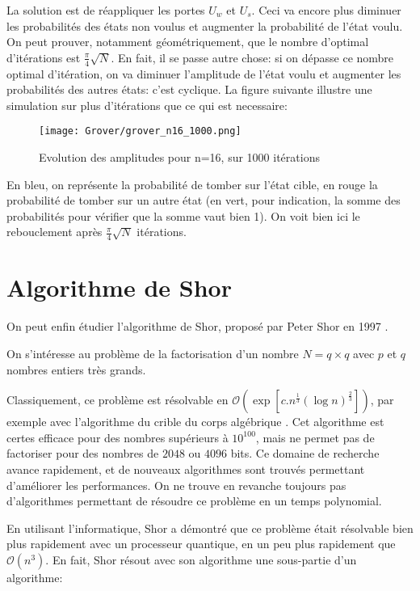 La solution est de réappliquer les portes $U_w$ et $U_s$. Ceci va encore plus diminuer les probabilités des états non voulus et augmenter la probabilité de l'état voulu.
On peut prouver, notamment géométriquement, que le nombre d'optimal d'itérations est $\frac{\pi}{4}\sqrt{N}$. En fait, il se passe autre chose: si on dépasse ce nombre optimal d'itération, on va diminuer l'amplitude de l'état voulu et augmenter les probabilités des autres états: c'est cyclique. La figure suivante illustre une simulation sur plus d'itérations que ce qui est necessaire:

\begin{figure}[htbp]
  \centering
  \texttt{[image: Grover/grover\_n16\_1000.png]}
  \caption{Evolution des amplitudes pour n=16, sur 1000 itérations}
\end{figure}

En bleu, on représente la probabilité de tomber sur l'état cible, en rouge la probabilité de tomber sur un autre état (en vert, pour indication, la somme des probabilités pour vérifier que la somme vaut bien 1). On voit bien ici le rebouclement après $\frac{\pi}{4}\sqrt{N}$ itérations.

\section{Algorithme de Shor}

On peut enfin étudier l'algorithme de Shor, proposé par Peter Shor en 1997 \cite{Shor97}.

\begin{pb}
  On s'intéresse au problème de la factorisation d'un nombre $N=q \times q$ avec $p$ et $q$ nombres entiers très grands.
\end{pb}

Classiquement, ce problème est résolvable en $\mathcal{O}(\exp{[c . n^{\frac{1}{3}} (\log n)^{\frac{2}{3}} ]})$, par exemple avec l'algorithme du crible du corps algébrique \cite{NFS-RSA220}. Cet algorithme est certes efficace pour des nombres supérieurs à $10^{100}$, mais ne permet pas de factoriser pour des nombres de $2048$ ou $4096$ bits. Ce domaine de recherche avance rapidement, et de nouveaux algorithmes sont trouvés permettant d'améliorer les performances. On ne trouve en revanche toujours pas d'algorithmes permettant de résoudre ce problème en un temps polynomial.

En utilisant l'informatique, Shor a démontré que ce problème était résolvable bien plus rapidement avec un processeur quantique, en un peu plus rapidement que $\mathcal{O}(n^3)$. En fait, Shor résout avec son algorithme une sous-partie d'un algorithme:

